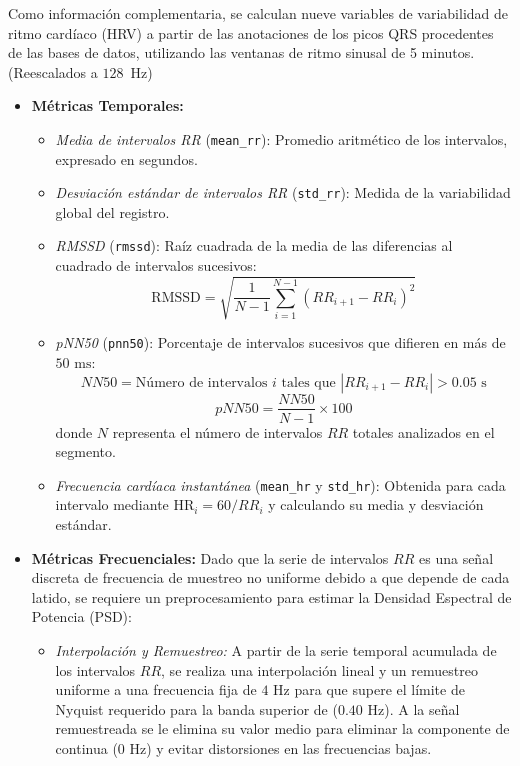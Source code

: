 Como información complementaria, se calculan nueve variables de variabilidad de ritmo cardíaco (HRV)
a partir de las anotaciones de los picos QRS procedentes de las bases de datos, utilizando las ventanas
de ritmo sinusal de 5 minutos. (Reescalados a $128$~Hz)

\begin{itemize}
      \item \textbf{Métricas Temporales:}
      \begin{itemize}
          \item \textit{Media de intervalos RR} (\texttt{mean\_rr}): Promedio aritmético de los intervalos, expresado en segundos.
          \item \textit{Desviación estándar de intervalos RR} (\texttt{std\_rr}): Medida de la variabilidad global del registro.
          \item \textit{RMSSD} (\texttt{rmssd}): Raíz cuadrada de la media de las diferencias al cuadrado de intervalos sucesivos:
          \begin{equation}
              \text{RMSSD} = \sqrt{\frac{1}{N-1} \sum_{i=1}^{N-1} (RR_{i+1} - RR_i)^2}
          \end{equation}
          \item \textit{pNN50} (\texttt{pnn50}): Porcentaje de intervalos sucesivos que difieren en más
          de $50\text{ ms}$:
          \begin{equation}
              NN50 = \text{Número de intervalos } i \text{ tales que } |RR_{i+1} - RR_i| > 0.05\text{ s}
          \end{equation}
          \begin{equation}
              pNN50 = \frac{NN50}{N - 1} \times 100
          \end{equation}
          donde $N$ representa el número de intervalos $RR$ totales analizados en el segmento.
          \item \textit{Frecuencia cardíaca instantánea} (\texttt{mean\_hr} y \texttt{std\_hr}):
          Obtenida para cada intervalo mediante $\text{HR}_i = 60 / RR_i$
          y calculando su media y desviación estándar.
      \end{itemize}

      \item \textbf{Métricas Frecuenciales:}
      Dado que la serie de intervalos $RR$ es una señal discreta de frecuencia de muestreo no uniforme debido
      a que depende de cada latido, se requiere un preprocesamiento para estimar la Densidad Espectral
      de Potencia (PSD):
      \begin{itemize}
          \item \textit{Interpolación y Remuestreo:} A partir de la serie temporal acumulada de los
          intervalos $RR$, se realiza una interpolación lineal y un remuestreo uniforme a una frecuencia
          fija de $4\text{ Hz}$ para que supere el límite de Nyquist requerido para la
          banda superior de ($0.40\text{ Hz}$). A la señal remuestreada se le elimina su valor
          medio para eliminar la componente de continua ($0\text{ Hz}$) y evitar distorsiones en las
          frecuencias bajas.


\end{itemize}
\end{itemize}
